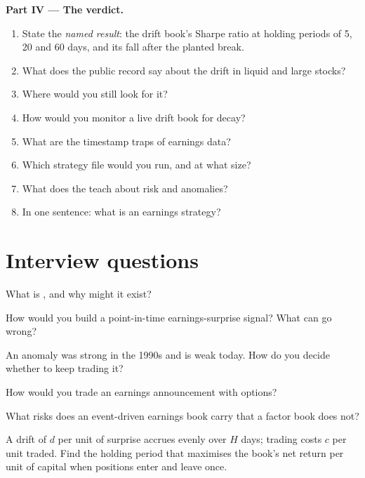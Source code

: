 \begin{problem}
\medskip\noindent\textbf{Part IV --- The verdict.}
\begin{enumerate}[resume]
\item State the \emph{named result}: the drift book's Sharpe ratio at holding periods of 5, 20 and 60 days, and its fall after the planted break.
\item What does the public record say about the drift in liquid and large stocks?
\item Where would you still look for it?
\item How would you monitor a live drift book for decay?
\item What are the timestamp traps of earnings data?
\item Which strategy file would you run, and at what size?
\item What does the  teach about risk and anomalies?
\item In one sentence: what is an earnings strategy?
\end{enumerate}
\end{problem}

\section{Interview questions}

\begin{interviewq}\label{iq:s1:earnings:1}
What is , and why might it exist?
\end{interviewq}

\begin{interviewq}\label{iq:s1:earnings:2}
How would you build a point-in-time earnings-surprise signal? What can go wrong?
\end{interviewq}

\begin{interviewq}\label{iq:s1:earnings:3}
An anomaly was strong in the 1990s and is weak today. How do you decide whether to keep trading it?
\end{interviewq}

\begin{interviewq}\label{iq:s1:earnings:4}
How would you trade an earnings announcement with options?
\end{interviewq}

\begin{interviewq}\label{iq:s1:earnings:5}
What risks does an event-driven earnings book carry that a factor book does not?
\end{interviewq}

\begin{interviewq}\label{iq:s1:earnings:6}
A drift of $d$ per unit of surprise accrues evenly over $H$ days; trading costs $c$ per unit traded. Find the holding period that maximises the book's net
return per unit of capital when positions enter and leave once.
\end{interviewq}
